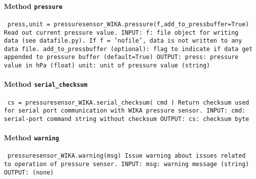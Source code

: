 \paragraph{Method \texttt{pressure}}
\vspace{1ex}
\texttt{\newline
press,unit = pressuresensor_WIKA.pressure(f,add_to_pressbuffer=True)\newline
\newline
Read out current pressure value.\newline
\newline
INPUT:\newline
f: file object for writing data (see datafile.py). If f = 'nofile', data is not written to any data file.\newline
add_to_pressbuffer (optional): flag to indicate if data get appended to pressure buffer (default=True)\newline
\newline
OUTPUT:\newline
press: pressure value in hPa (float)\newline
unit: unit of pressure value (string)\newline
\newline
}

\paragraph{Method \texttt{serial_checksum}}
\vspace{1ex}
\texttt{\newline
cs = pressuresensor_WIKA.serial_checksum( cmd )\newline
\newline
Return checksum used for serial port communication with WIKA pressure sensor.\newline
\newline
INPUT:\newline
cmd: serial-port command string without checksum\newline
\newline
OUTPUT:\newline
cs: checksum byte\newline
\newline
}

\paragraph{Method \texttt{warning}}
\vspace{1ex}
\texttt{\newline
pressuresensor_WIKA.warning(msg)\newline
\newline
Issue warning about issues related to operation of pressure sensor.\newline
\newline
INPUT:\newline
msg: warning message (string)\newline
\newline
OUTPUT:\newline
(none)\newline
\newline
}

